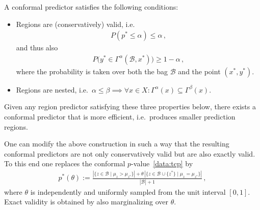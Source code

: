     \begin{property}[Optimality]
        A conformal predictor satisfies the following conditions:
        \begin{itemize}
            \item Regions are (conservatively) valid, i.e.
                \begin{gather}
                    P(p^*\leq\alpha)\leq\alpha\,,
                \end{gather}
                and thus also
                \begin{gather}
                    P\bigl(y^*\in\Gamma^\alpha(\mathcal{B},x^*)\bigr)\geq1-\alpha\,,
                \end{gather}
                where the probability is taken over both the bag $\mathcal{B}$ and the point $(x^*,y^*)$.
            \item Regions are nested, i.e.~$\alpha\leq\beta\implies\forall x\in X:\Gamma^\alpha(x)\subseteq\Gamma^\beta(x)$.
        \end{itemize}
        Given any region predictor satisfying these three properties below, there exists a conformal predictor that is more efficient, i.e.~produces smaller prediction regions.
    \end{property}

    \begin{property}\label{data:smooth_cp}
        One can modify the above construction in such a way that the resulting conformal predictors are not only conservatively valid but are also exactly valid. To this end one replaces the conformal $p$-value~\eqref{data:tcp} by
        \begin{gather}
            p^*(\theta) := \frac{|\{z\in\mathcal{B}\mid\mu_z>\mu_{z^*}\}| + \theta\,|\{z\in\mathcal{B}\cup\{z^*\}\mid\mu_z=\mu_{z^*}\}|}{|\mathcal{B}|+1}\,,
        \end{gather}
        where $\theta$ is independently and uniformly sampled from the unit interval $[0,1]$. Exact validity is obtained by also marginalizing over $\theta$.
    \end{property}

